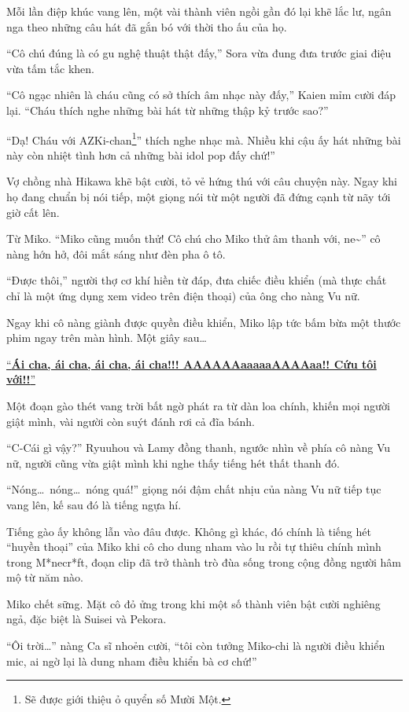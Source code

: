 \documentclass[../main.tex]{subfiles}
\begin{document}
Mỗi lần điệp khúc vang lên, một vài thành viên ngồi gần đó lại khẽ lắc lư, ngân nga theo những câu hát đã gắn bó với thời tho ấu của họ.

``Cô chú đúng là có gu nghệ thuật thật đấy,'' Sora vừa đung đưa trước giai điệu vừa tấm tắc khen.

``Cô ngạc nhiên là cháu cũng có sở thích âm nhạc này đấy,'' Kaien mỉm cười đáp lại. ``Cháu thích nghe những bài hát từ những thập kỷ trước sao?''

``Dạ! Cháu với AZKi-chan\footnote{Sẽ được giới thiệu ỏ quyển số Mười Một.}'' thích nghe nhạc mà. Nhiều khi cậu ấy hát những bài này còn nhiệt tình hơn cả những bài idol pop đấy chứ!''

Vợ chồng nhà Hikawa khẽ bật cười, tỏ vẻ hứng thú với câu chuyện này. Ngay khi họ đang chuẩn bị nói tiếp, một giọng nói từ một người đã đứng cạnh từ nãy tới giờ cất lên.

Từ Miko. ``Miko cũng muốn thử! Cô chú cho Miko thử âm thanh với, ne\~{}'' cô nàng hớn hở, đôi mắt sáng như đèn pha ô tô.

``Được thôi,'' người thợ cơ khí hiền từ đáp, đưa chiếc điều khiển (mà thực chất chỉ là một ứng dụng xem video trên điện thoại) của ông cho nàng Vu nữ.

Ngay khi cô nàng giành được quyền điều khiển, Miko lập tức bấm bừa một thước phim ngay trên màn hình. Một giây sau\dots

\href{https://www.youtube.com/watch?v=I7_tBbluNZ4&t=3270s}{``\textbf{Ái cha, ái cha, ái cha, ái cha!!! AAAAAAaaaaaAAAAaa!! Cứu tôi với!!}''}

Một đoạn gào thét vang trời bất ngờ phát ra từ dàn loa chính, khiến mọi người giật mình, vài người còn suýt đánh rơi cả đĩa bánh.

``C-Cái gì vậy?'' Ryuuhou và Lamy đồng thanh, ngước nhìn về phía cô nàng Vu nữ, người cũng vừa giật mình khi nghe thấy tiếng hét thất thanh đó.

``Nóng\dots\ nóng\dots\ nóng quá!'' giọng nói đậm chất nhịu của nàng Vu nữ tiếp tục vang lên, kế sau đó là tiếng ngựa hí.

Tiếng gào ấy không lẫn vào đâu được. Không gì khác, đó chính là tiếng hét ``huyền thoại'' của Miko khi cô cho dung nham vào lu rồi tự thiêu chính mình trong M*necr*ft, đoạn clip đã trở thành trò đùa sống trong cộng đồng người hâm mộ từ năm nào.

Miko chết sững. Mặt cô đỏ ửng trong khi một số thành viên bật cười nghiêng ngả, đặc biệt là Suisei và Pekora.

``Ôi trời\dots'' nàng Ca sĩ nhoẻn cười, ``tôi còn tưởng Miko-chi là người điều khiển mic, ai ngờ lại là dung nham điều khiển bà cơ chứ!''
\end{document}
